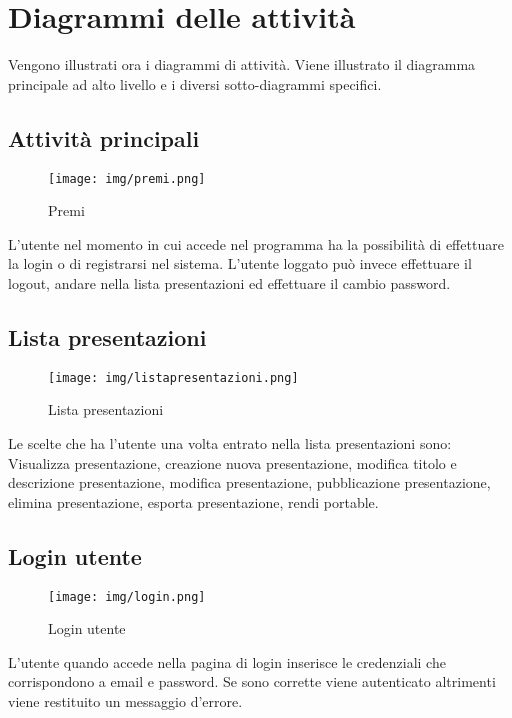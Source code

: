 \section{Diagrammi delle attività}
Vengono illustrati ora i diagrammi di attività. Viene illustrato il diagramma principale ad alto livello e i diversi sotto-diagrammi specifici.

\subsection{Attività principali}

\begin{figure}[h!]
		\centering
		\texttt{[image: img/premi.png]}
		\caption{Premi}
		\label{fig:ModelloSpy}
\end{figure}

L'utente nel momento in cui accede nel programma ha la possibilità di effettuare la login o di registrarsi nel sistema. 
L'utente loggato può invece effettuare il logout, andare nella lista presentazioni ed effettuare il cambio password. 

\subsection{Lista presentazioni}

\begin{figure}[h!]
		\centering
		\texttt{[image: img/listapresentazioni.png]}
		\caption{Lista presentazioni}
		\label{fig:ModelloSpy}
\end{figure}

Le scelte che ha l'utente una volta entrato nella lista presentazioni sono: Visualizza presentazione, creazione nuova presentazione, modifica titolo e descrizione presentazione, modifica presentazione, pubblicazione presentazione, elimina presentazione, esporta presentazione, rendi portable.

\subsection{Login utente}

\begin{figure}[h!]
		\centering
		\texttt{[image: img/login.png]}
		\caption{Login utente}
		\label{fig:ModelloSpy}
\end{figure}

L'utente quando accede nella pagina di login inserisce le credenziali che corrispondono a email e password. Se sono corrette viene autenticato altrimenti viene restituito un messaggio d'errore.


